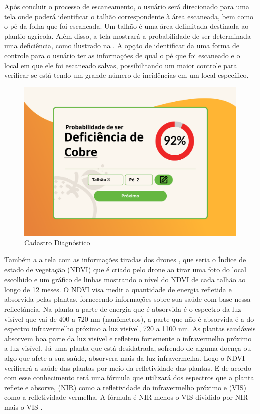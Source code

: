 \documentclass[
  a4paper,%
  12pt,%
  english,%
  brazilian,%
]{article}
\begin{document}
Após concluir o processo de escaneamento, o usuário será direcionado para uma tela onde poderá identificar o talhão correspondente à área escaneada, bem como o pé da folha que foi escaneada. Um talhão é uma área delimitada destinada ao plantio agrícola. Além disso, a tela mostrará a probabilidade de ser determinada uma deficiência, como ilustrado na . A opção de identificar da uma forma de controle para o usuário ter as informações de qual o pé que foi escaneado e o local em que ele foi escaneado salvas, possibilitando um maior controle para verificar se está tendo um grande número de incidências em um local específico.

\begin{figure}[H]
\centering
\caption{Cadastro Diagnóstico}%
\label{fig:cadastro-diagnóstico}
\includegraphics[width=0.8\linewidth]{Logos/Cadastro-diagnostico.png}
\end{figure}

Também a a tela com as informações tiradas dos drones , que seria o Índice de  estado de vegetação (NDVI) que é criado pelo drone ao tirar uma foto do local escolhido e um gráfico de linhas mostrando o nível do NDVI de cada talhão ao longo de 12 meses. O NDVI visa medir a quantidade de energia refletida e absorvida pelas plantas, fornecendo informações sobre sua saúde com base nessa reflectância. Na planta a parte de energia que é absorvida é o espectro da luz visível que vai de 400 a 720 nm (nanômetros), a parte que não é absorvida é a do espectro infravermelho próximo a luz visível, 720 a 1100 nm. As plantas saudáveis absorvem boa parte da luz visível e refletem fortemente o infravermelho próximo a luz visível. Já uma planta que está desidatrada, sofrendo de alguma doença ou algo que afete a sua saúde, absorvera mais da luz infravermelha. Logo o NDVI verificará a saúde das plantas por meio da refletividade das plantas. E de acordo com esse conhecimento terá uma fórmula que utilizará dos espectros que a planta reflete e absorve, (NIR) como a refletividade do infravermelho próximo e (VIS) como a refletividade vermelha. A fórmula é NIR menos o VIS dividido por NIR mais o VIS \cite{ResultadoNDVIArtigo, ResultadoNDVISite}.  
\end{document}
